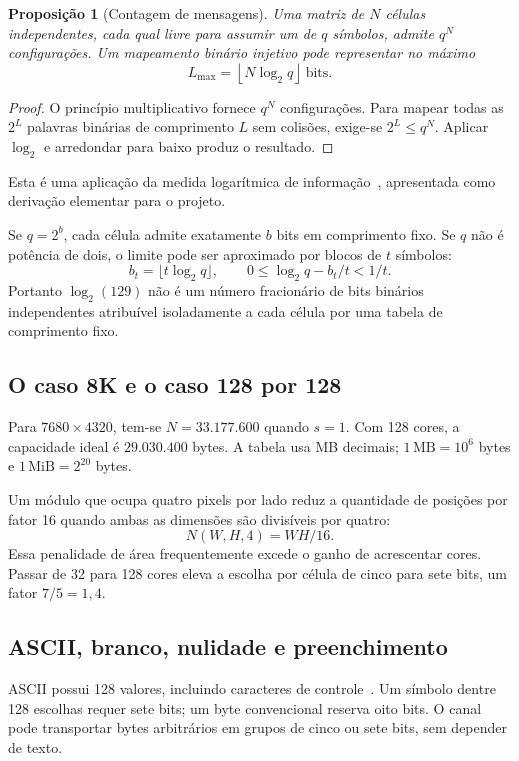 \documentclass[11pt,a4paper]{article}
\newtheorem{proposition}{Proposição}
\begin{document}
\begin{proposition}[Contagem de mensagens]
Uma matriz de $N$ células independentes, cada qual livre para assumir um de $q$ símbolos, admite $q^N$ configurações. Um mapeamento binário injetivo pode representar no máximo
\begin{equation}\label{eq:counting}
L_{\max}=\left\lfloor N\log_2 q\right\rfloor\ \text{bits}.
\end{equation}
\end{proposition}
\begin{proof}
O princípio multiplicativo fornece $q^N$ configurações. Para mapear todas as $2^L$ palavras binárias de comprimento $L$ sem colisões, exige-se $2^L\le q^N$. Aplicar $\log_2$ e arredondar para baixo produz o resultado.
\end{proof}
Esta é uma aplicação da medida logarítmica de informação~\cite{1948shannonCommunication}, apresentada como derivação elementar para o projeto.

Se $q=2^b$, cada célula admite exatamente $b$ bits em comprimento fixo. Se $q$ não é potência de dois, o limite pode ser aproximado por blocos de $t$ símbolos:
\begin{equation}
b_t=\lfloor t\log_2q\rfloor,\qquad
0\le\log_2q-b_t/t<1/t.
\end{equation}
Portanto $\log_2(129)$ não é um número fracionário de bits binários independentes atribuível isoladamente a cada célula por uma tabela de comprimento fixo.

\subsection{O caso 8K e o caso 128 por 128}

Para $7680\times4320$, tem-se $N=33.177.600$ quando $s=1$. Com 128 cores, a capacidade ideal é $29.030.400$ bytes. A tabela usa MB decimais; $1\,\mathrm{MB}=10^6$ bytes e $1\,\mathrm{MiB}=2^{20}$ bytes.

Um módulo que ocupa quatro pixels por lado reduz a quantidade de posições por fator 16 quando ambas as dimensões são divisíveis por quatro:
\begin{equation}
N(W,H,4)=WH/16.
\end{equation}
Essa penalidade de área frequentemente excede o ganho de acrescentar cores. Passar de 32 para 128 cores eleva a escolha por célula de cinco para sete bits, um fator $7/5=1,4$.

\subsection{ASCII, branco, nulidade e preenchimento}
ASCII possui 128 valores, incluindo caracteres de controle~\cite{1969cerfAscii}. Um símbolo dentre 128 escolhas requer sete bits; um byte convencional reserva oito bits. O canal pode transportar bytes arbitrários em grupos de cinco ou sete bits, sem depender de texto.
\end{document}
